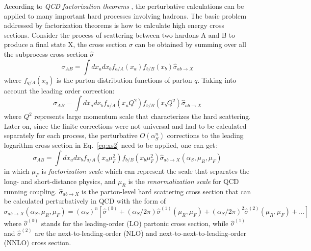 According to \textit{QCD factorization theorems} \cite{Collins:1989gx}, the perturbative calculations can be applied to many important
hard processes involving hadrons. The basic problem addressed by factorization theorems is how to calculate high energy cross sections.
Consider the process of scattering between two hardons A and B to produce a final state X, the cross section $\sigma$ can be obtained 
by summing over all the subprocess cross section $\hat{\sigma}$ \cite{Stirling:1194745}
\begin{equation}
	\sigma_{AB} = \int dx_{a} dx_{b} f_{a/A}\left(x_{a}\right) f_{b/B}\left(x_{b}\right) \hat{\sigma}_{ab\rightarrow X}
\end{equation}
where $f_{q/A}\left(x_{q}\right)$ is the parton distribution functions of parton $q$.
Taking into account the leading order correction:
\begin{equation} \label{eq:xs2}
	\sigma_{AB} = \int dx_{a} dx_{b} f_{a/A}\left(x_{a}Q^{2}\right) f_{b/B}\left(x_{b}Q^{2}\right) \hat{\sigma}_{ab\rightarrow X}
\end{equation}
where $Q^{2}$ represents large momentum scale that characterizes the hard scattering.
Later on, since the finite corrections were not universal and had to be calculated separately for each process,
the perturbative $O\left(\alpha_{S}^{n}\right)$ corrections to the leading logarithm cross section in Eq.~\ref{eq:xs2}
need to be applied, one can get:
\begin{equation}
	\sigma_{AB} = \int dx_{a} dx_{b} f_{a/A}\left(x_{a}\mu_{F}^{2}\right) f_{b/B}\left(x_{b}\mu_{F}^{2}\right) \hat{\sigma}_{ab\rightarrow X}\left(\alpha_{S},\mu_{R},\mu_{F}\right)
\end{equation}
in which $\mu_{F}$ is \textit{factorization scale} which can represent the scale that separates the long- and short-distance physics,
and $\mu_{R}$ is the \textit{renormalization scale} for QCD running coupling.
$\hat{\sigma}_{ab\rightarrow X}$ is the parton-level hard scattering cross section that can be calculated perturbatively in QCD with the form of
\begin{equation} \label{eq:xs3}
	\hat{\sigma}_{ab\rightarrow X}\left(\alpha_{S},\mu_{R},\mu_{F}\right) 
		= \left(\alpha_{S}\right)^{n} \left[ \hat{\sigma}^{(0)}
		+ \left(\alpha_{S}/2\pi\right) \hat{\sigma}^{(1)}\left(\mu_{R},\mu_{F}\right)
		+ \left(\alpha_{S}/2\pi\right)^{2} \hat{\sigma}^{(2)}\left(\mu_{R},\mu_{F}\right)
		+ ... \right]
\end{equation}
where $\hat{\sigma}^{(0)}$ stands for the leading-order (LO) partonic cross section,
while $\hat{\sigma}^{(1)}$ and $\hat{\sigma}^{(2)}$ are the next-to-leading-order (NLO) and
next-to-next-to-leading-order (NNLO) cross section.

